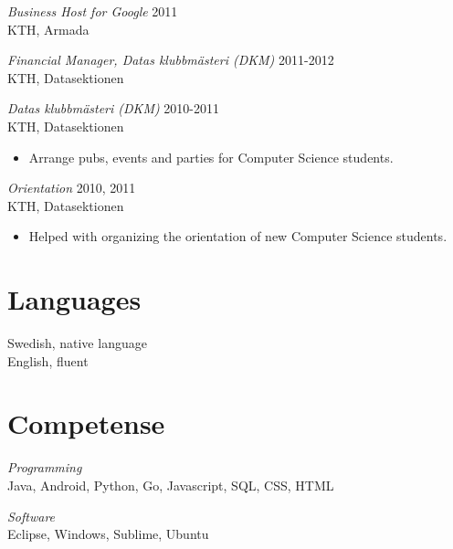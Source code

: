 \documentclass[margin, 10pt]{res} %
\begin{document}
\begin{resume}
{\sl Business Host for Google} \hfill 2011 \\
KTH, Armada

{\sl Financial Manager, Datas klubbmästeri (DKM)} \hfill 2011-2012 \\
KTH, Datasektionen

{\sl Datas klubbmästeri (DKM)} \hfill 2010-2011 \\
KTH, Datasektionen
\begin{itemize} 
\item Arrange pubs, events and parties for Computer Science students.
\end{itemize}

{\sl Orientation} \hfill 2010, 2011 \\
KTH, Datasektionen
\begin{itemize} 
\item Helped with organizing the orientation of new Computer Science students.
\end{itemize}


\section{Languages}
Swedish, native language \\
English, fluent


\section{Competense}
{\sl Programming} \\
Java, Android, Python, Go, Javascript, SQL, CSS, HTML

{\sl Software} \\
Eclipse, Windows, Sublime, Ubuntu


\end{resume}
\end{document}
